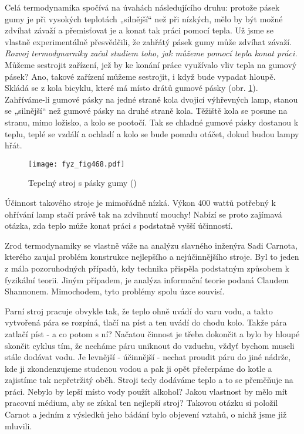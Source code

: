     Celá termodynamika spočívá na úvahách následujícího druhu: protože pásek gumy je při vysokých
    teplotách „silnější“ než při nízkých, mělo by být možné zdvíhat závaží a přemisťovat je a konat
    tak práci pomocí tepla. Už jsme se vlastně experimentálně přesvědčili, že zahřátý pásek gumy
    může zdvíhat závaží. \emph{Rozvoj termodynarniky začal studiem toho, jak můžeme pomocí tepla
    konat práci.} Můžeme sestrojit zařízení, jež by ke konání práce využívalo vliv tepla na gumový
    pásek? Ano, takové zařízení můžeme sestrojit, i když bude vypadat hloupě. Skládá se z kola
    bicyklu, které má místo drátů gumové pásky (obr. \ref{fyz:fig468}). Zahříváme-li gumové pásky na
    jedné straně kola dvojicí výhřevných lamp, stanou se „silnější“ než gumové pásky na druhé straně
    kola. Těžiště kola se posune na stranu, mimo ložisko, a kolo se pootočí. Tak se chladné gumové
    pásky dostanou k teplu, teplé se vzdálí a ochladí a kolo se bude pomalu otáčet, dokud budou
    lampy hřát.

    \begin{figure}[ht!] %
      \centering
      \texttt{[image: fyz\_fig468.pdf]}
      \caption{ Tepelný stroj s pásky gumy (\cite[s.~707]{Feynman01})}
      \label{fyz:fig468}
    \end{figure}

    Účinnost takového stroje je mimořádně nízká. Výkon 400 wattů potřebný k ohřívání lamp stačí
    právě tak na zdvihnutí mouchy! Nabízí se proto zajímavá otázka, zda teplo může konat práci s
    podstatně vyšší účinností.

    Zrod termodynamiky se vlastně váže na analýzu slavného inženýra Sadi Carnota, kterého zaujal
    problém konstrukce nejlepšího a nejúčinnějšího stroje. Byl to jeden z mála pozoruhodných
    případů, kdy technika přispěla podstatným způsobem k fyzikální teorii. Jiným případem, je
    analýza informační teorie podaná Claudem Shannonem. Mimochodem, tyto problémy spolu úzce
    souvisí.

    Parní stroj pracuje obvykle tak, že teplo ohně uvádí do varu vodu, a takto vytvořená pára se
    rozpíná, tlačí na píst a ten uvádí do chodu kolo. Takže pára zatlačí píst - a co potom s ní?
    Načatou činnost je třeba dokončit a bylo by hloupé skončit cyklus tím, že necháme páru
    uniknout do vzduchu, vždyť bychom museli stále dodávat vodu. Je levnější - účinnější - nechat
    proudit páru do jiné nádrže, kde ji zkondenzujeme studenou vodou a pak ji opět přečerpáme
    do kotle a zajistíme tak nepřetržitý oběh. Stroji tedy dodáváme teplo a to se přeměňuje na práci.
    Nebylo by lepší místo vody použít alkohol? Jakou vlastnost by mělo mít pracovní médium, aby
    se získal ten nejlepší stroj? Takovou otázku si položil Carnot a jedním z výsledků jeho bádání
    bylo objevení vztahů, o nichž jsme již mluvili.

